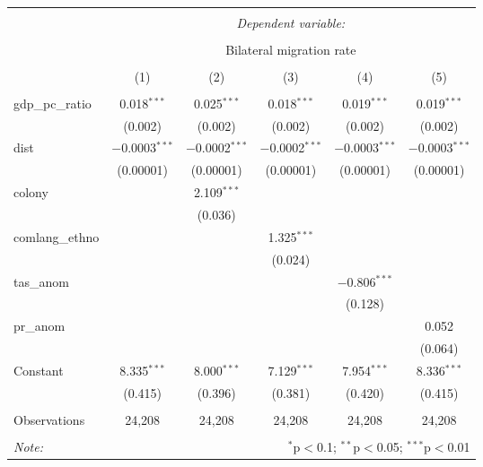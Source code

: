 
\begin{table}[!htbp] \centering 
  \caption{} 
  \label{} 
\begin{tabular}{@{\extracolsep{0pt}}lccccc} 
\\[-1.8ex]\hline 
\hline \\[-1.8ex] 
 & \multicolumn{5}{c}{\textit{Dependent variable:}} \\ 
\cline{2-6} 
\\[-1.8ex] & \multicolumn{5}{c}{Bilateral migration rate} \\ 
\\[-1.8ex] & (1) & (2) & (3) & (4) & (5)\\ 
\hline \\[-1.8ex] 
 gdp\_pc\_ratio & 0.018$^{***}$ & 0.025$^{***}$ & 0.018$^{***}$ & 0.019$^{***}$ & 0.019$^{***}$ \\ 
  & (0.002) & (0.002) & (0.002) & (0.002) & (0.002) \\ 
  dist & $-$0.0003$^{***}$ & $-$0.0002$^{***}$ & $-$0.0002$^{***}$ & $-$0.0003$^{***}$ & $-$0.0003$^{***}$ \\ 
  & (0.00001) & (0.00001) & (0.00001) & (0.00001) & (0.00001) \\ 
  colony &  & 2.109$^{***}$ &  &  &  \\ 
  &  & (0.036) &  &  &  \\ 
  comlang\_ethno &  &  & 1.325$^{***}$ &  &  \\ 
  &  &  & (0.024) &  &  \\ 
  tas\_anom &  &  &  & $-$0.806$^{***}$ &  \\ 
  &  &  &  & (0.128) &  \\ 
  pr\_anom &  &  &  &  & 0.052 \\ 
  &  &  &  &  & (0.064) \\ 
  Constant & 8.335$^{***}$ & 8.000$^{***}$ & 7.129$^{***}$ & 7.954$^{***}$ & 8.336$^{***}$ \\ 
  & (0.415) & (0.396) & (0.381) & (0.420) & (0.415) \\ 
 \hline \\[-1.8ex] 
Observations & 24,208 & 24,208 & 24,208 & 24,208 & 24,208 \\ 
\hline 
\hline \\[-1.8ex] 
\textit{Note:}  & \multicolumn{5}{r}{$^{*}$p$<$0.1; $^{**}$p$<$0.05; $^{***}$p$<$0.01} \\ 
\end{tabular} 
\end{table} 
